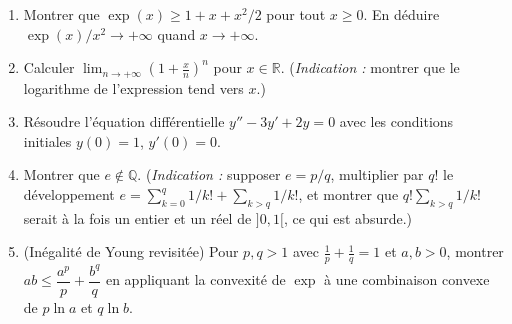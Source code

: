 \begin{mdframed}[style=exobar]
  \begin{enumerate}
    \item Montrer que $\exp(x) \geq 1 + x + x^2/2$ pour tout $x \geq 0$.
          En déduire $\exp(x)/x^2 \to +\infty$ quand $x\to+\infty$.

    \item Calculer $\displaystyle\lim_{n\to+\infty}\left(1+\frac{x}{n}\right)^n$
          pour $x\in\mathbb{R}$. (\textit{Indication :} montrer que le logarithme
          de l'expression tend vers $x$.)

    \item Résoudre l'équation différentielle $y'' - 3y' + 2y = 0$
          avec les conditions initiales $y(0) = 1$, $y'(0) = 0$.

    \item Montrer que $e \notin \mathbb{Q}$. (\textit{Indication :} supposer
          $e = p/q$, multiplier par $q!$ le développement
          $e = \sum_{k=0}^q 1/k! + \sum_{k>q} 1/k!$,
          et montrer que $q!\sum_{k>q} 1/k!$ serait à la fois un entier
          et un réel de $]0,1[$, ce qui est absurde.)

    \item (Inégalité de Young revisitée)
          Pour $p, q > 1$ avec $\tfrac{1}{p}+\tfrac{1}{q}=1$ et $a, b > 0$,
          montrer $ab \leq \dfrac{a^p}{p}+\dfrac{b^q}{q}$ en appliquant
          la convexité de $\exp$ à une combinaison convexe de $p\ln a$ et
          $q\ln b$.
  \end{enumerate}
\end{mdframed}

